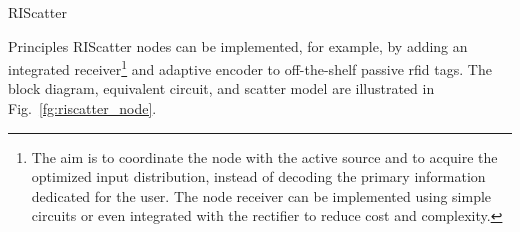 \begin{section}{RIScatter}
\begin{subsection}{Principles}
		RIScatter nodes can be implemented, for example, by adding an integrated receiver\footnote{The aim is to coordinate the node with the active source and to acquire the optimized input distribution, instead of decoding the primary information dedicated for the user. The node receiver can be implemented using simple circuits or even integrated with the rectifier \cite{Kim2021a} to reduce cost and complexity.\label{fn:integrated_receiver}} \cite{Kim2021a} and adaptive encoder \cite{He2020e} to off-the-shelf passive \gls{rfid} tags.
		The block diagram, equivalent circuit, and scatter model are illustrated in Fig.~\ref{fg:riscatter_node}.
		\begin{figure*}[!t]
			\centering
			\caption{
			Block diagram, equivalent circuit, and scatter model of a RIScatter node.
			The solid and dashed vectors represent signal and energy flows.
			The scatter antenna behaves as a constant power source, where the voltage $V_0$ and current $I_0$ are introduced by incident electric field $\vec{E}_{\text{I}}$ and magnetic field $\vec{H}_{\text{I}}$ \cite{Huang2021}.
			}
			\label{fg:riscatter_node}
		\end{figure*}
	\end{subsection}


\end{section}
